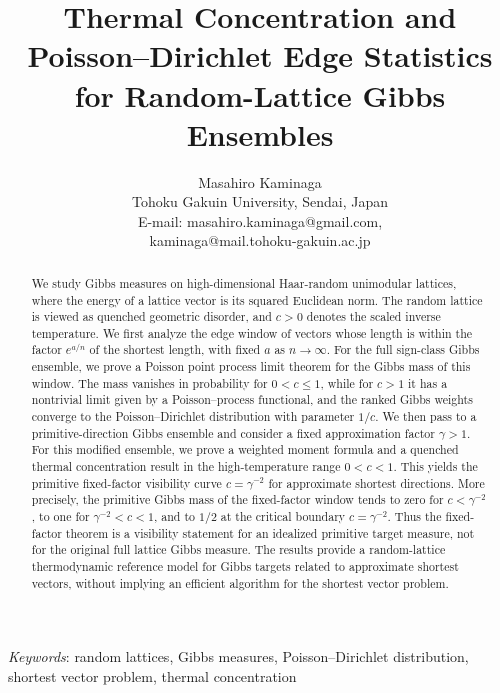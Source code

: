 \documentclass[a4paper,12pt]{article}
\title{Thermal Concentration and Poisson--Dirichlet Edge Statistics for Random-Lattice Gibbs Ensembles}
\author{Masahiro Kaminaga\\
Tohoku Gakuin University, Sendai, Japan\\
E-mail: masahiro.kaminaga@gmail.com, \\
kaminaga@mail.tohoku-gakuin.ac.jp}
\date{}
\theoremstyle{definition}
\theoremstyle{remark}
\begin{document}
\maketitle

\begin{abstract}
We study Gibbs measures on high-dimensional Haar-random unimodular lattices, where the energy of a lattice vector is its squared Euclidean norm.
The random lattice is viewed as quenched geometric disorder, and $c>0$ denotes the scaled inverse temperature.
We first analyze the edge window of vectors whose length is within the factor $e^{a/n}$ of the shortest length, with fixed $a$ as $n\to\infty$.
For the full sign-class Gibbs ensemble, we prove a Poisson point process limit theorem for the Gibbs mass of this window.
The mass vanishes in probability for $0<c\le1$, while for $c>1$ it has a nontrivial limit given by a Poisson--process functional, and the ranked Gibbs weights converge to the Poisson--Dirichlet distribution with parameter $1/c$.
We then pass to a primitive-direction Gibbs ensemble and consider a fixed approximation factor $\gamma>1$.
For this modified ensemble, we prove a weighted moment formula and a quenched thermal concentration result in the high-temperature range $0<c<1$.
This yields the primitive fixed-factor visibility curve $c=\gamma^{-2}$ for approximate shortest directions.
More precisely, the primitive Gibbs mass of the fixed-factor window tends to zero for $c<\gamma^{-2}$, to one for $\gamma^{-2}<c<1$, and to $1/2$ at the critical boundary $c=\gamma^{-2}$.
Thus the fixed-factor theorem is a visibility statement for an idealized primitive target measure, not for the original full lattice Gibbs measure.
The results provide a random-lattice thermodynamic reference model for Gibbs targets related to approximate shortest vectors, without implying an efficient algorithm for the shortest vector problem.
\end{abstract}


\noindent\textit{Keywords}: random lattices, Gibbs measures, Poisson--Dirichlet distribution,
shortest vector problem, thermal concentration
\end{document}
